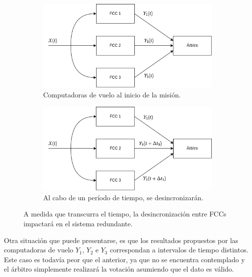 \begin{figure}[H]
    \centering
    \begin{subfigure}[b]{0.49\textwidth}
        \includegraphics[width=\textwidth]{img/3_4_1_sincronizacion_1.png}
        \caption{Computadoras de vuelo al inicio de la misión.}
        \label{fig:3_4_1_sincronizacion_1}
    \end{subfigure}
    \begin{subfigure}[b]{0.49\textwidth}
        \includegraphics[width=\textwidth]{img/3_4_1_sincronizacion_2.png}
        \caption{Al cabo de un período de tiempo, se desincronizarán.}
        \label{fig:3_4_1_sincronizacion_2}
    \end{subfigure}
    \caption{A medida que transcurra el tiempo, la desincronización entre FCCs impactará en el sistema redundante.}
    \label{fig:3_4_1_sincronizacion}
\end{figure}

Otra situación que puede presentarse, es que los resultados propuestos por las computadoras de vuelo $Y_1$, $Y_2$ e $Y_3$ correspondan a intervalos de tiempo distintos. Este caso es todavía peor que el anterior, ya que no se encuentra contemplado y el árbitro simplemente realizará la votación asumiendo que el dato es válido.

